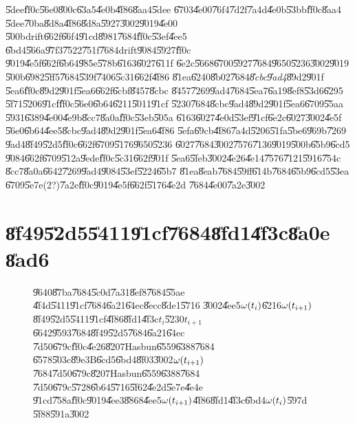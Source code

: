 \documentclass[12pt,a4paper]{article}
\begin{document}
\U{5dee}\U{ff0c}\U{56e0}\U{800c}\U{63a5}\U{4e0b}\U{4f86}\U{8aa4}\U{5dee}%
\U{6703}\U{4e00}\U{76f4}\U{7d2f}\U{7a4d}\U{4e0b}\U{53bb}\U{ff0c}\U{8aa4}%
\U{5dee}\U{70ba}\U{8d8a}\U{4f86}\U{8d8a}\U{5927}\U{3002}\U{9019}\U{4e00}%
\U{500b}drift\U{662f}\U{66f4}\U{91cd}\U{8981}\U{7684}\U{ff0c}\U{53ef}\U{4ee5}%
\U{6bd4}\U{566a}\U{97f3}\U{7522}\U{751f}\U{7684}drift\U{9084}\U{5927}\U{ff0c}%
\U{9019}\U{4e5f}\U{662f}\U{6b64}\U{985e}\U{578b}\U{6163}\U{6027}\U{611f}%
\U{6e2c}\U{5668}\U{6700}\U{5927}\U{7684}\U{9650}\U{5236}\U{3002}\U{9019}%
\U{500b}\U{6982}\U{5ff5}\U{7684}\U{539f}\U{7406}\U{5c31}\U{662f}\U{4f86}%
\U{81ea}\U{6240}\U{8b02}\U{7684}\textit{\U{8cbc}\U{9ad4}}\U{89d2}\U{901f}%
\U{5ea6}\U{ff0c}\U{89d2}\U{901f}\U{5ea6}\U{662f}\U{6cbf}\U{8457}\U{8cbc}%
\U{8457}\U{7269}\U{9ad4}\U{7684}\U{5ea7}\U{6a19}\U{8ef8}\U{53d6}\U{6295}%
\U{5f71}\U{5206}\U{91cf}\U{ff0c}\U{56e0}\U{6b64}\U{6211}\U{5011}\U{91cf}%
\U{5230}\U{7684}\U{8cbc}\U{9ad4}\U{89d2}\U{901f}\U{5ea6}\U{6709}\U{55aa}%
\U{5931}\U{6389}\U{4e00}\U{4e9b}\U{8cc7}\U{8a0a}\U{ff0c}\U{53eb}\U{505a}%
\U{6163}\U{6027}\U{4e0d}\U{53ef}\U{91cf}\U{6e2c}\U{6027}\U{3002}\U{4e5f}%
\U{56e0}\U{6b64}\U{4ee5}\U{8cbc}\U{9ad4}\U{89d2}\U{901f}\U{5ea6}\U{4f86}%
\U{5efa}\U{69cb}\U{4f86}\U{7a4d}\U{5206}\U{51fa}\U{5be6}\U{969b}\U{7269}%
\U{9ad4}\U{8f49}\U{52d5}\U{ff0c}\U{662f}\U{6709}\U{5176}\U{9650}\U{5236}%
\U{6027}\U{7684}\U{3002}\U{7576}\U{7136}\U{9019}\U{500b}\U{65b9}\U{6cd5}%
\U{9084}\U{662f}\U{6709}\U{512a}\U{9ede}\U{ff0c}\U{5c31}\U{662f}\U{901f}%
\U{5ea6}\U{5feb}\U{3002}\U{4e26}\U{4e14}\U{7576}\U{7121}\U{5916}\U{754c}%
\U{8cc7}\U{8a0a}\U{6642}\U{7269}\U{9ad4}\U{9084}\U{53ef}\U{5224}\U{65b7}%
\U{81ea}\U{8eab}\U{7684}\U{59ff}\U{614b}\U{7684}\U{65b9}\U{6cd5}\U{53ea}%
\U{6709}\U{5e7e}(2?)\U{7a2e}\U{ff0c}\U{9019}\U{4e5f}\U{662f}\U{5176}\U{4e2d}%
\U{7684}\U{4e00}\U{7a2e}\U{3002}

\bigskip

\section{\U{8f49}\U{52d5}\U{5411}\U{91cf}\U{7684}\U{8fd1}\U{4f3c}\U{8a0e}%
\U{8ad6}}

\begin{figure}[th]
\caption{\U{9640}\U{87ba}\U{7684}\U{5c0d}\U{7a31}\U{8ef8}\U{7684}\U{55ae}%
\U{4f4d}\U{5411}\U{91cf}\U{7684}\U{6a21}\U{64ec}\U{8ecc}\U{8de1}\U{5716}%
\U{3002}\U{4ee5}$\protect\omega (t_{i})$\U{6216}$\protect\omega (t_{i+1})$%
\U{8f49}\U{52d5}\U{5411}\U{91cf}\U{4f86}\U{8fd1}\U{4f3c}$t_{i}$\U{5230}$%
t_{i+1}$\U{6642}\U{9593}\U{7684}\U{8f49}\U{52d5}\U{7684}\U{6a21}\U{64ec}%
\U{7d50}\U{679c}\U{ff0c}\U{4e26}\U{8207}Hasbun\U{6559}\U{6388}\U{7684}%
\U{6578}\U{503c}\U{89e3}B\U{6cd5}\U{6bd4}\U{8f03}\U{3002}$\protect\omega %
(t_{i+1})$\U{7684}\U{7d50}\U{679c}\U{8207}Hasbun\U{6559}\U{6388}\U{7684}%
\U{7d50}\U{679c}\U{5728}\U{6b64}\U{5716}\U{5f62}\U{4e2d}\U{5e7e}\U{4e4e}%
\U{91cd}\U{758a}\U{ff0c}\U{9019}\U{4ee3}\U{8868}\U{4ee5}$\protect\omega %
(t_{i+1})$\U{4f86}\U{8fd1}\U{4f3c}\U{6bd4}$\protect\omega (t_{i})$\U{597d}%
\U{5f88}\U{591a}\U{3002}}
\begin{center}
\fbox{}
\end{center}
\end{figure}
\end{document}
